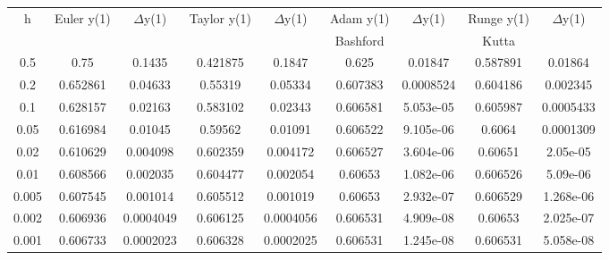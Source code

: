 \begin{center}
\begin{longtable}{|| c || c c || c c || c c || c c ||}
\hline
h & Euler y(1) & $\Delta$y(1) & Taylor y(1) & $\Delta$y(1) & Adam y(1) & $\Delta$y(1) & Runge y(1) & $\Delta$y(1) \\
 & & & & & Bashford & & Kutta & \\
\hline
0.5 & 0.75 & 0.1435 & 0.421875 & 0.1847 & 0.625 & 0.01847 & 0.587891 & 0.01864 \\
0.2 & 0.652861 & 0.04633 & 0.55319 & 0.05334 & 0.607383 & 0.0008524 & 0.604186 & 0.002345 \\
0.1 & 0.628157 & 0.02163 & 0.583102 & 0.02343 & 0.606581 & 5.053e-05 & 0.605987 & 0.0005433 \\
0.05 & 0.616984 & 0.01045 & 0.59562 & 0.01091 & 0.606522 & 9.105e-06 & 0.6064 & 0.0001309 \\
0.02 & 0.610629 & 0.004098 & 0.602359 & 0.004172 & 0.606527 & 3.604e-06 & 0.60651 & 2.05e-05 \\
0.01 & 0.608566 & 0.002035 & 0.604477 & 0.002054 & 0.60653 & 1.082e-06 & 0.606526 & 5.09e-06 \\
0.005 & 0.607545 & 0.001014 & 0.605512 & 0.001019 & 0.60653 & 2.932e-07 & 0.606529 & 1.268e-06 \\
0.002 & 0.606936 & 0.0004049 & 0.606125 & 0.0004056 & 0.606531 & 4.909e-08 & 0.60653 & 2.025e-07 \\
0.001 & 0.606733 & 0.0002023 & 0.606328 & 0.0002025 & 0.606531 & 1.245e-08 & 0.606531 & 5.058e-08 \\
\hline
\end{longtable}
\end{center}
